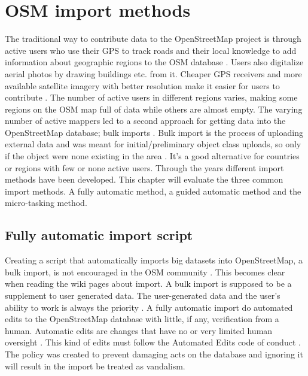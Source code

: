  \chapter{OSM import methods}\label{ch:importmethods}

The traditional way to contribute data to the OpenStreetMap project is through active users who use their GPS to track roads and their local knowledge to add information about geographic regions to the OSM database \cite{Zielstra2013}. Users also digitalize aerial photos by drawing buildings etc. from it. Cheaper GPS receivers and more available satellite imagery with better resolution make it easier for users to contribute \cite{Chilton}. The number of active users in different regions varies, making some regions on the OSM map full of data while others are almost empty. The varying number of active mappers led to a second approach for getting data into the OpenStreetMap database; bulk imports \cite{Zielstra2013}.  Bulk import is the process of uploading external data and was meant for initial/preliminary object class uploads, so only if the object were none existing in the area  \cite{Zielstra2013}.  It's a good alternative for countries or regions with few or none active users. Through the years different import methods have been developed. This chapter will evaluate the three common import methods. A fully automatic method, a guided automatic method and the micro-tasking method. %

\section{Fully automatic import script}
Creating a script that automatically imports big datasets into OpenStreetMap, a bulk import, is not encouraged in the OSM community \cite{Zielstra2013}. This becomes clear when reading the wiki pages about import. A bulk import is supposed to be a supplement to user generated data. The user-generated data and the user's ability to work is always the priority \cite{OSMimport}. A fully automatic import do automated edits to the OpenStreetMap database with little, if any, verification from a human. Automatic edits are changes that have no or very limited human oversight \cite{OSMAutiEdit}. This kind of edits must follow the Automated Edits code of conduct \cite{OSMAutomaticEdits}. The policy was created to prevent damaging acts on the database and ignoring it will result in the import be treated as vandalism. 

